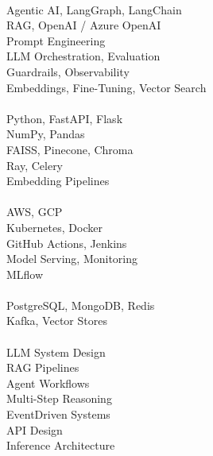 \documentclass[letterpaper]{deedy-resume} %
\begin{document}
\begin{minipage}[t]{0.33\textwidth}
 \\
Agentic AI, LangGraph, LangChain \\
RAG, OpenAI / Azure OpenAI \\
Prompt Engineering \\
LLM Orchestration, Evaluation \\
Guardrails, Observability \\
Embeddings, Fine-Tuning, Vector Search \\
\sectionspace %
 \\
Python, FastAPI, Flask \\
NumPy, Pandas \\
FAISS, Pinecone, Chroma \\
Ray, Celery \\
Embedding Pipelines \\
\sectionspace %
 \\
AWS, GCP \\
Kubernetes, Docker \\
GitHub Actions, Jenkins \\
Model Serving, Monitoring \\
MLflow \\
\sectionspace %
 \\
PostgreSQL, MongoDB, Redis \\
Kafka, Vector Stores \\
\sectionspace %
 \\
LLM System Design \\
RAG Pipelines \\
Agent Workflows \\
Multi-Step Reasoning \\
Event\-Driven Systems \\
API Design \\
Inference Architecture \\



\sectionspace


\sectionspace %

\sectionspace %


\end{minipage} %
\end{document}
